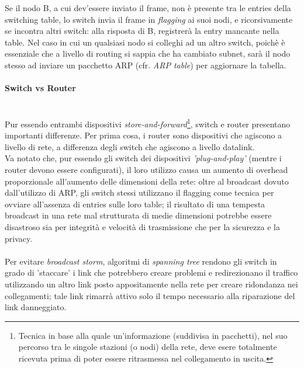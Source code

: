 Se il nodo B, a cui dev'essere inviato il frame, non è presente tra le entries della switching table, lo switch invia il frame in \textit{flagging} ai suoi nodi, e ricorsivamente se incontra altri switch: alla risposta di B, registrerà la entry mancante nella table. Nel caso in cui un qualsiasi nodo si colleghi ad un altro switch, poichè è essenziale che a livello di routing si sappia che ha cambiato subnet, sarà il nodo stesso ad inviare un pacchetto ARP (cfr. \textit{ARP table}) per aggiornare la tabella. \\

\paragraph{Switch vs Router} \hfill \\
Pur essendo entrambi dispositivi \textit{store-and-forward}\footnote{Tecnica in base alla quale un'informazione (suddivisa in pacchetti), nel suo percorso tra le singole stazioni (o nodi) della rete, deve esere totalmente ricevuta prima di poter essere ritrasmessa nel collegamento in uscita.}, switch e router presentano importanti differenze. Per prima cosa, i router sono dispositivi che agiscono a livello di rete, a differenza degli switch che agiscono a livello datalink. \\
Va notato che, pur essendo gli switch dei dispositivi \textit{'plug-and-play'} (mentre i router devono essere configurati), il loro utilizzo causa un aumento di overhead proporzionale all'aumento delle dimensioni della rete: oltre al broadcast dovuto dall'utilizzo di ARP, gli switch stessi utilizzano il flagging come tecnica per ovviare all'assenza di entries sulle loro table; il risultato di una tempesta broadcast in una rete mal strutturata di medie dimensioni potrebbe essere disastroso sia per integrità e velocità di trasmissione che per la sicurezza e la privacy.\\\\
Per evitare \textit{broadcast storm}, algoritmi di \textit{spanning tree} rendono gli switch in grado di 'staccare' i link che potrebbero creare problemi e redirezionano il traffico utilizzando un altro link posto appositamente nella rete per creare ridondanza nei collegamenti; tale link rimarrà attivo solo il tempo necessario alla riparazione del link danneggiato.

